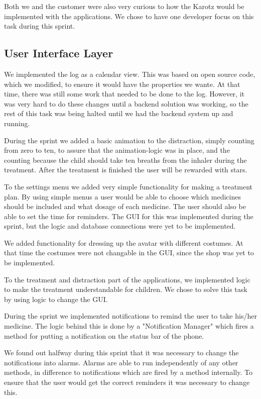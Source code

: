 Both we and the customer were also very curious to how the Karotz would
be implemented with the applications. We chose to have one developer focus on this task
during this sprint.

\subsection{User Interface Layer}
We implemented the log as a calendar view. This was based on open source code, 
which we modified, to ensure it would have the properties we wante. At that time, there was still some work that needed to be done to the log. However, it was 
very hard to do these changes until a backend solution was working, so the rest of this 
task was being halted until we had the backend system up and running.

During the sprint we added a basic animation to the distraction, simply counting from zero
to ten, to assure that the animation-logic was in place, and the counting because the child should take ten
breaths from the inhaler during the treatment. After the treatment is finished the user will be rewarded with stars.

To the settings menu we added very simple functionality for making a
treatment plan. By using simple menus a user would be able to choose which medicines should be
included and what dosage of each medicine. The user should also be able to set the time
for reminders. The GUI for this was implemented during the sprint, but the logic and database
connections were yet to be implemented.

We added functionality for dressing up the avatar with different costumes.
At that time the costumes were not changable in the GUI, since the shop was
yet to be implemented.

To the treatment and distraction part of the applications, we implemented logic to make
the treatment understandable for children. We chose to solve this task by using logic to change the GUI.

During the sprint we implemented notifications to remind the user to take his/her medicine.
The logic behind this is done by a "Notification Manager" which fires a method for putting a notification
on the status bar of the phone.

We found out halfway during this sprint that it was necessary to change the notifications into
alarms. Alarms are able to run independently of any other methods, in difference to notifications which
are fired by a method internally. To ensure that the user would get the correct reminders it was
necessary to change this.


